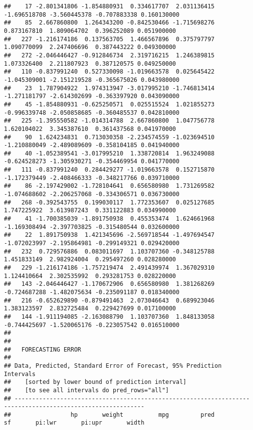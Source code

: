 \documentclass[]{article}
\begin{document}
\begin{verbatim}
##    17 -2.801341806 -1.854880931  0.334617707  2.031136415 -1.696518708 -3.560445378 -0.707883338 0.160130000 
##    85  2.667860800  1.264343200 -0.842530466 -1.715698276  0.873167810  1.809064702  0.396252089 0.051900000 
##   227 -1.216174186  0.137563705  1.466567896  0.375797797  1.090770099  2.247406696  0.387443222 0.049300000 
##   272 -2.046446427 -0.912846734  2.319716215  1.246389815  1.073326400  2.211807923  0.387120575 0.049250000 
##   110 -0.837991240  0.527330098 -1.019663578  0.025645422 -1.045309001 -2.151219528 -0.365675026 0.043980000 
##    23  1.787904922  1.974313947 -3.017995210 -1.746813414 -1.271181797 -2.614302699 -0.363397920 0.043090000 
##    45 -1.854880931 -0.625250571  0.025515524  1.021855273 -0.996339748 -2.050858685 -0.360485537 0.042810000 
##   225 -1.395550582 -1.014314788  2.667860800  1.047756778  1.620104022  3.345387610  0.361437568 0.041970000 
##    90  1.624234831  0.713030358 -2.234574559 -1.023694510 -1.210880049 -2.489089609 -0.358104185 0.041940000 
##    40 -1.052389541 -3.017995210  1.338720814  1.963249088 -0.624528273 -1.305930271 -0.354469954 0.041770000 
##   111 -0.837991240  0.284429277 -1.019663578  0.152715870 -1.172379449 -2.408466333 -0.348217766 0.039710000 
##    86 -2.197429002 -1.728104641  0.656580980  1.731269582 -1.074688602 -2.206257068 -0.334306571 0.036730000 
##   268 -0.392543755  0.199030117  1.772353607  0.025127685  1.747225922  3.613987243  0.331122883 0.034990000 
##    41 -1.700385039 -1.891750938  0.455353474  1.624661968 -1.169308494 -2.397703825 -0.315480544 0.032600000 
##    22  1.891750938  1.421345696 -2.569718544 -1.497694547 -1.072023997 -2.195864981 -0.299149321 0.029420000 
##   232  0.729576886  0.083011697  1.103707360 -0.348125788  1.451833149  2.982924004  0.295497260 0.028280000 
##   229 -1.216174186 -1.757219474  2.491439974  1.367029310  1.124410664  2.302535992  0.293281753 0.028220000 
##   143 -2.046446427 -1.170672906  0.656580980  1.381268269 -0.724687288 -1.482075634 -0.235091187 0.018340000 
##   216 -0.652629890 -0.879491463  2.073046643  0.689923046  1.383123597  2.832725484  0.229427699 0.017100000 
##   144 -1.911194085 -2.163088790  1.103707360  1.848133058 -0.744425697 -1.520065176 -0.223057542 0.016510000 
## 
## 
##   FORECASTING ERROR
## 
## Data, Predicted, Standard Error of Forecast, 95% Prediction Intervals 
##    [sorted by lower bound of prediction interval] 
##    [to see all intervals do pred_rows="all"] 
## ----------------------------------------------------------------------------------------------------------- 
##                 hp       weight          mpg         pred          sf       pi:lwr       pi:upr       width 

\end{verbatim}
\end{document}
